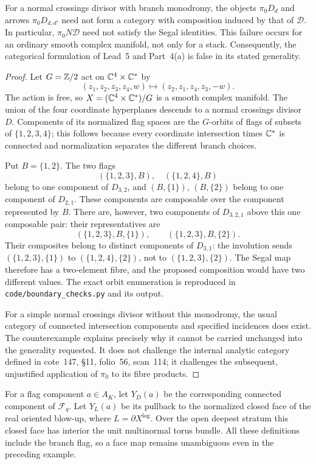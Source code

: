 \begin{proposition}
\label{P4a1}
For a normal crossings divisor with branch monodromy, the objects $\pi_0D_d$ and arrows $\pi_0D_{d,d'}$ need not form a category with composition induced by that of $\mathcal D$.  In particular, $\pi_0N\mathcal D$ need not satisfy the Segal identities.  This failure occurs for an ordinary smooth complex manifold, not only for a stack.  Consequently, the categorical formulation of Lead~5 and Part~4(a) is false in its stated generality.
\end{proposition}
\begin{proof}
Let $G=\mathbb Z/2$ act on $\mathbb C^4\times\mathbb C^*$ by
\[
 (z_1,z_2,z_3,z_4,w)\longmapsto(z_2,z_1,z_4,z_3,-w).
\]
The action is free, so $X=(\mathbb C^4\times\mathbb C^*)/G$ is a smooth complex manifold.  The union of the four coordinate hyperplanes descends to a normal crossings divisor $D$.  Components of its normalized flag spaces are the $G$-orbits of flags of subsets of $\{1,2,3,4\}$; this follows because every coordinate intersection times $\mathbb C^*$ is connected and normalization separates the different branch choices.

Put $B=\{1,2\}$.  The two flags
\[
 (\{1,2,3\},B),\quad(\{1,2,4\},B)
\]
belong to one component of $D_{3,2}$, and $(B,\{1\})$, $(B,\{2\})$ belong to one component of $D_{2,1}$.  These components are composable over the component represented by $B$.  There are, however, two components of $D_{3,2,1}$ above this one composable pair: their representatives are
\[
 (\{1,2,3\},B,\{1\}),\qquad
 (\{1,2,3\},B,\{2\}).
\]
Their composites belong to distinct components of $D_{3,1}$: the involution sends $(\{1,2,3\},\{1\})$ to $(\{1,2,4\},\{2\})$, not to $(\{1,2,3\},\{2\})$.  The Segal map therefore has a two-element fibre, and the proposed composition would have two different values.  The exact orbit enumeration is reproduced in \texttt{code/boundary\_checks.py} and its output.

For a simple normal crossings divisor without this monodromy, the usual category of connected intersection components and specified incidences does exist.  The counterexample explains precisely why it cannot be carried unchanged into the generality requested.  It does not challenge the internal analytic category defined in cote~147, \S11, folio~56, scan~114; it challenges the subsequent, unjustified application of $\pi_0$ to its fibre products.
\end{proof}

For a flag component $a\in A_K$, let $Y_D(a)$ be the corresponding connected component of $\mathcal F_q$.  Let $Y_L(a)$ be its pullback to the normalized closed face of the real oriented blow-up, where $L=\partial X^{\log}$.  Over the open deepest stratum this closed face has interior the unit multinormal torus bundle.  All these definitions include the branch flag, so a face map remains unambiguous even in the preceding example.

